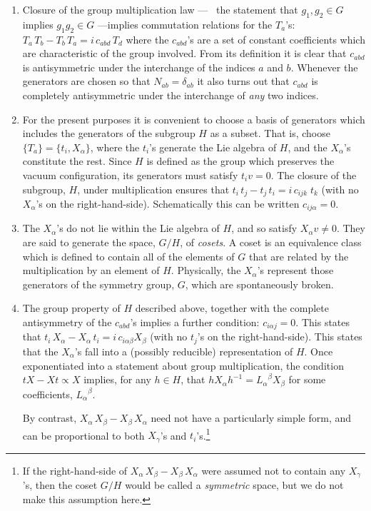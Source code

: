 \documentclass[12pt]{report}
\begin{document}
\begin{enumerate}
\item
Closure of the group multiplication law --- \ie\ the statement
that $g_1, g_2 \in G$ implies $g_1 g_2 \in G$ ---implies
commutation relations for the $T_a$'s: $T_a \,T_b - 
T_b \, T_a = i \, c_{abd} 
\, T_d$ where the $c_{abd}$'s are a set of constant
coefficients which are characteristic of the group
involved. From its definition it is clear that $c_{abd}$ is
antisymmetric under the interchange of the indices $a$ and
$b$. Whenever the generators are chosen so that $N_{ab} =
\delta_{ab}$ it also turns out that $c_{abd}$ is completely
antisymmetric under the interchange of {\em any} two indices.

\item
For the present purposes it is convenient to choose a basis
of generators which includes the generators of the subgroup
$H$ as a subset. That is, choose $\{ T_a \} = \{ t_i,
X_\alpha \}$, where the $t_i$'s generate the Lie algebra of
$H$, and the $X_\alpha$'s constitute the rest. Since $H$ is
defined as the group which preserves the vacuum
configuration, its generators must satisfy $t_i v = 0$. The
closure of the subgroup, $H$, under multiplication ensures
that $t_i \, t_j - t_j \, t_i = i \, c_{ijk} \; t_k$ (with
no $X_\alpha$'s on the right-hand-side). Schematically this
can be written $c_{ij\alpha} = 0$.

\item
The $X_\alpha$'s do not lie within the Lie algebra of $H$,
and so satisfy $X_\alpha v \neq 0$. They are said to
generate the space, $G/H$, of {\em cosets}. A coset is an
equivalence class which is defined to contain all of the
elements of $G$ that are related by the multiplication by
an element of $H$. Physically, the $X_\alpha$'s represent
those generators of the symmetry group, $G$, which are
spontaneously broken.

\item
The group property of $H$ described above, together with
the complete antisymmetry of the $c_{abd}$'s implies a
further condition: $c_{i\alpha j} = 0$. This states that
$t_i \, X_\alpha - X_\alpha \, t_i = i \, c_{i \alpha
\beta} X_\beta$ (with no $t_j$'s on the right-hand-side).
This states that the $X_\alpha$'s fall into a (possibly
reducible) representation of $H$. Once exponentiated into a
statement about group multiplication, the condition $tX - Xt
\propto X$ implies,  for any $h \in H$, that $h X_\alpha
h^{-1} = {L_\alpha}^\beta X_\beta$ for some coefficients,
${L_\alpha
}^\beta$.

By contrast, $X_\alpha \,X_\beta - X_\beta \, X_\alpha$
need not have a particularly simple form, and can be
proportional to both $X_\gamma$'s and $t_i$'s.\footnote{If
the right-hand-side of $X_\alpha \,X_\beta - X_\beta \,
X_\alpha$ were assumed not to contain any  $X_\gamma$'s,
then the coset $G/H$ would be called a {\em symmetric}
space, but we do not make this assumption here.}

\end{enumerate}
\end{document}
